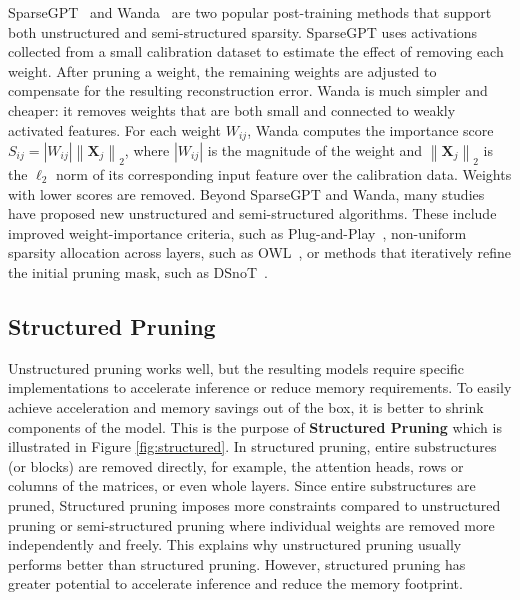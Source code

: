 SparseGPT~\citep{frantar2023sparsegpt} and Wanda~\citep{sun2024wanda} are two popular post-training 
methods that support both unstructured and semi-structured sparsity. 
SparseGPT uses activations collected from a small calibration dataset to estimate the effect of removing each weight. 
After pruning a weight, the remaining weights are adjusted to compensate for the resulting reconstruction error.
Wanda is much simpler and cheaper: it removes weights that are both small and connected to weakly activated features.
For each weight $W_{ij}$, Wanda computes the importance score $S_{ij} = \left|W_{ij}\right| \left\|\mathbf{X}_{j}\right\|_{2}$,
where $\left|W_{ij}\right|$ is the magnitude of the weight and $\left\|\mathbf{X}_{j}\right\|_{2}$ is the $\ell_2$ norm of its corresponding
input feature over the calibration data. Weights with lower scores are removed.
Beyond SparseGPT and Wanda, many studies have proposed new unstructured and semi-structured algorithms.
These include improved weight-importance criteria, such as Plug-and-Play~\citep{zhang2024plugandplay},
non-uniform sparsity allocation across layers, such as OWL~\citep{yin2024owl}, or methods that iteratively
refine the initial pruning mask, such as DSnoT~\citep{zhang2024dsnot}.

\subsection{Structured Pruning}
Unstructured pruning works well, but the resulting models require specific implementations to accelerate
inference or reduce memory requirements. To easily achieve acceleration and memory savings out of the box,
it is better to shrink components of the model. This is the purpose of \textbf{Structured Pruning} 
which is illustrated in Figure \ref{fig:structured}.
In structured pruning, entire substructures (or blocks) are removed directly, 
for example, the attention heads, rows or columns of the matrices, or even whole layers.
Since entire substructures are pruned, Structured pruning imposes more constraints compared
to unstructured pruning or semi-structured pruning where individual weights are removed
more independently and freely. This explains why unstructured pruning usually performs better
than structured pruning. However, structured pruning has greater potential
to accelerate inference and reduce the memory footprint.

